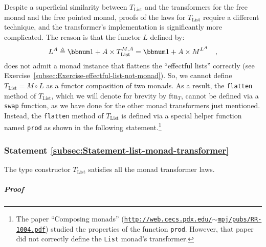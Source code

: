 Despite a superficial similarity between $T_{\text{List}}$ and the
transformers for the free monad and the free pointed monad, proofs
of the laws for $T_{\text{List}}$ require a different technique,
and the transformer\textsf{'}s implementation is significantly more complicated.
The reason is that the functor $L$ defined by:
\[
L^{A}\triangleq\bbnum 1+A\times T_{\text{List}}^{M,A}=\bbnum 1+A\times M^{L^{A}}\quad,
\]
does not admit a monad instance that flattens the \textsf{``}effectful lists\textsf{''}
correctly (see Exercise~\ref{subsec:Exercise-effectful-list-not-monad}).
So, we cannot define $T_{\text{List}}=M\circ L$ as a functor composition
of two monads. As a result, the \lstinline!flatten! method of $T_{\text{List}}$,
which we will denote for brevity by $\text{ftn}_{T}$, cannot be defined
via a \lstinline!swap! function, as we have done for the other monad
transformers just mentioned. Instead, the \lstinline!flatten! method
of $T_{\text{List}}$ is defined via a special helper function named
\lstinline!prod! as shown in the following statement.\footnote{The paper \textsf{``}Composing monads\textsf{''} (\texttt{\href{http://web.cecs.pdx.edu/~mpj/pubs/RR-1004.pdf}{http://web.cecs.pdx.edu/$\sim$mpj/pubs/RR-1004.pdf}})
studied the properties of the function \lstinline!prod!. However,
that paper did not correctly define the \lstinline!List! monad\textsf{'}s
transformer.}

\subsubsection{Statement \label{subsec:Statement-list-monad-transformer}\ref{subsec:Statement-list-monad-transformer}}

The type constructor $T_{\text{List}}$ satisfies all the monad transformer
laws.

\subparagraph{Proof}

